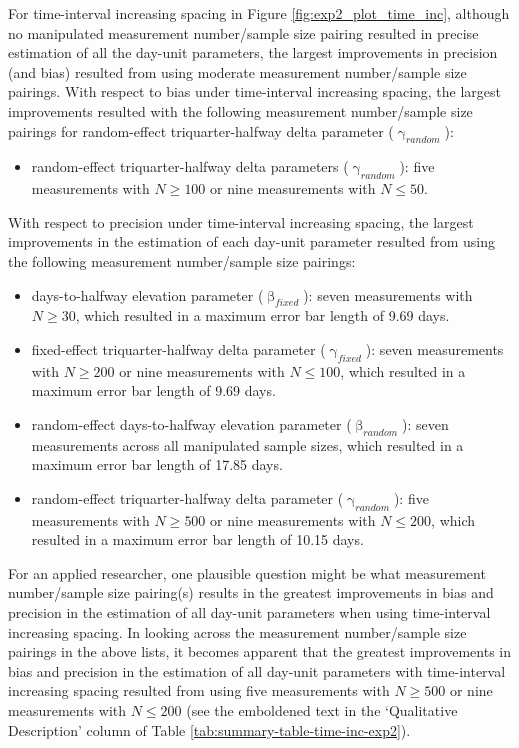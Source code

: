 \documentclass[
12pt, %
twoside,
english]{guelphthesis}
\begin{document}
For time-interval increasing spacing in Figure \ref{fig:exp2_plot_time_inc}, although no manipulated measurement number/sample size pairing resulted in precise estimation of all the day-unit parameters, the largest improvements in precision (and bias) resulted from using moderate measurement number/sample size pairings. With respect to bias under time-interval increasing spacing, the largest improvements resulted with the following measurement number/sample size pairings for random-effect triquarter-halfway delta parameter (\(\upgamma_{random}\)):
\begin{itemize}
\tightlist
\item
  random-effect triquarter-halfway delta parameters (\(\upgamma_{random}\)): five measurements with \(N \ge 100\) or nine measurements with \(N \le 50\).
\end{itemize}
\noindent With respect to precision under time-interval increasing spacing, the largest improvements in the estimation of each day-unit parameter resulted from using the following measurement number/sample size pairings:
\begin{itemize}
\tightlist
\item
  days-to-halfway elevation parameter (\(\upbeta_{fixed}\)): seven measurements with \(N \ge 30\), which resulted in a maximum error bar length of 9.69 days.
\item
  fixed-effect triquarter-halfway delta parameter (\(\upgamma_{fixed}\)): seven measurements with \(N \ge 200\) or nine measurements with \(N \le 100\), which resulted in a maximum error bar length of 9.69 days.
\item
  random-effect days-to-halfway elevation parameter (\(\upbeta_{random}\)): seven measurements across all manipulated sample sizes, which resulted in a maximum error bar length of 17.85 days.
\item
  random-effect triquarter-halfway delta parameter (\(\upgamma_{random}\)): five measurements with \(N \ge 500\) or nine measurements with \(N \le 200\), which resulted in a maximum error bar length of 10.15 days.
\end{itemize}
For an applied researcher, one plausible question might be what measurement number/sample size pairing(s) results in the greatest improvements in bias and precision in the estimation of all day-unit parameters when using time-interval increasing spacing. In looking across the measurement number/sample size pairings in the above lists, it becomes apparent that the greatest improvements in bias and precision in the estimation of all day-unit parameters with time-interval increasing spacing resulted from using five measurements with \(N \ge 500\) or nine measurements with \(N \le 200\) (see the emboldened text in the `Qualitative Description' column of Table \ref{tab:summary-table-time-inc-exp2}).
\end{document}
